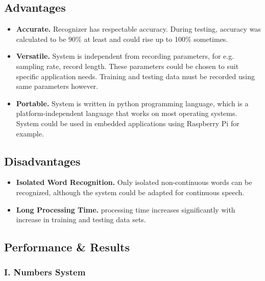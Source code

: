 \documentclass[12pt, a4paper, twoside]{report}
\begin{document}
\subsection{Advantages}
\begin{itemize}[noitemsep]
\item \textbf{Accurate.} Recognizer has respectable accuracy. During testing, accuracy was calculated to be 90\% at least and could rise up to 100\% sometimes.
\item \textbf{Versatile.} System is independent from recording parameters, for e.g. sampling rate, record length. These parameters could be chosen to suit specific application needs. Training and testing data must be recorded using same parameters however.
\item \textbf{Portable.} System is written in python programming language, which is a platform-independent language that works on most operating systems. System could be used in embedded applications using Raspberry Pi for example.
\end{itemize}
\subsection{Disadvantages}
\begin{itemize}[noitemsep]
\item \textbf{Isolated Word Recognition.} Only isolated non-continuous words can be recognized, although the system could be adapted for continuous speech.
\item \textbf{Long Processing Time.} processing time increases significantly with increase in training and testing data sets.
\end{itemize}
\subsection{Performance \& Results}
\subsubsection{I. Numbers System}
\end{document}
